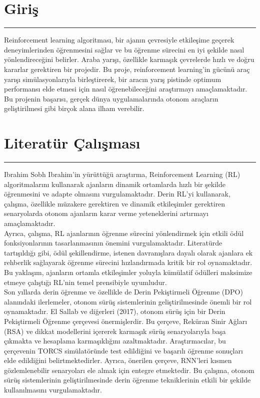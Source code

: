 \documentclass{article}
\begin{document}
\section{Giriş}
\rule{\textwidth}{0.5pt}
Reinforcement learning algoritması, bir ajanın çevresiyle etkileşime geçerek deneyimlerinden öğrenmesini sağlar ve bu öğrenme sürecini en iyi şekilde nasıl yönlendireceğini belirler. Araba yarışı, özellikle karmaşık çevrelerde hızlı ve doğru kararlar gerektiren bir projedir. Bu proje, reinforcement learning'in gücünü araç yarışı simülasyonlarıyla birleştirerek, bir aracın yarış pistinde optimum performansı elde etmesi için nasıl öğrenebileceğini araştırmayı amaçlamaktadır. Bu projenin başarısı, gerçek dünya uygulamalarında otonom araçların geliştirilmesi gibi birçok alana ilham verebilir.\\[15pt]

\section{Literatür Çalışması}
\rule{\textwidth}{0.5pt}
Ibrahim Sobh Ibrahim'in yürüttüğü araştırma\cite{kiran2021deep}, Reinforcement Learning (RL) algoritmalarını kullanarak ajanların dinamik ortamlarda hızlı bir şekilde öğrenmesini ve adapte olmasını vurgulamaktadır. Derin RL'yi kullanarak, çalışma, özellikle müzakere gerektiren ve dinamik etkileşimler gerektiren senaryolarda otonom ajanların karar verme yeteneklerini artırmayı amaçlamaktadır.\\[5pt]
\newline
Ayrıca, çalışma, RL ajanlarının öğrenme sürecini yönlendirmek için etkili ödül fonksiyonlarının tasarlanmasının önemini vurgulamaktadır. Literatürde tartışıldığı gibi, ödül şekillendirme, istenen davranışlara dayalı olarak ajanlara ek rehberlik sağlayarak öğrenme sürecini hızlandırmada kritik bir rol oynamaktadır. Bu yaklaşım, ajanların ortamla etkileşimler yoluyla kümülatif ödülleri maksimize etmeye çalıştığı RL'nin temel prensibiyle uyumludur.
\\[5pt]
\newline
Son yıllarda derin öğrenme ve özellikle de Derin Pekiştirmeli Öğrenme (DPO) alanındaki ilerlemeler\cite{sallab2017deep}, otonom sürüş sistemlerinin geliştirilmesinde önemli bir rol oynamaktadır. El Sallab ve diğerleri (2017), otonom sürüş için bir Derin Pekiştirmeli Öğrenme çerçevesi önermişlerdir. Bu çerçeve, Reküran Sinir Ağları (RSA) ve dikkat modellerini içererek karmaşık sürüş senaryolarıyla başa çıkmakta ve hesaplama karmaşıklığını azaltmaktadır. Araştırmacılar, bu çerçevenin TORCS simülatöründe test edildiğini ve başarılı öğrenme sonuçları elde edildiğini belirtmektedirler. Ayrıca, önerilen çerçeve, RNN'leri kısmen gözlemlenebilir senaryoları ele almak için entegre etmektedir. Bu çalışma, otonom sürüş sistemlerinin geliştirilmesinde derin öğrenme tekniklerinin etkili bir şekilde kullanılmasını vurgulamaktadır.\\[15pt]
\end{document}
